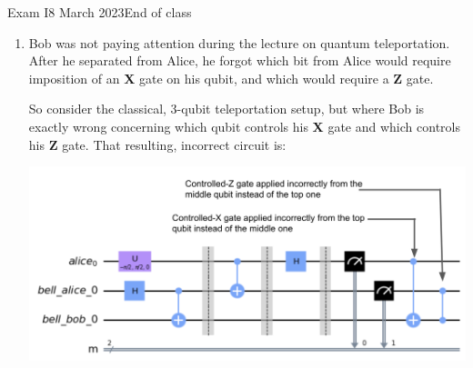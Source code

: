 \documentclass[12pt]{article}
\def\Gate#1{\mbox{\textbf{#1}}}
\def\X{\Gate{X}}
\def\Z{\Gate{Z}}
\newcommand{\Blank}[1][1in]{\mbox{\vrule width #1 depth 2pt}\vrule width 0pt height 2.0em}
\begin{document}
\begin{assignment}{Exam I}{8 March 2023}{End of class}
\begin{enumerate}
\begin{BBKey}
\begin{center}
\begin{tabular}{c|c||c|c||c|c||c}
\end{tabular}
\end{center}
\end{BBKey}
\begin{itemize}
    \item Alice believes the shared key is~\Blank[4in]{}
    \item Bob believes the shared key is\ \ ~\Blank[4in]{}
    \item Eve could have been detected in how many rows of your table?~\Blank{}
\end{itemize}

\clearpage\item{}
Bob was not paying attention during the lecture on quantum teleportation.  After he separated from Alice, he forgot which bit from Alice would require imposition of an \X{} gate on his qubit, and which would require a \Z{} gate.

So consider the classical, 3-qubit teleportation setup, but where Bob is exactly wrong concerning which qubit controls his \X{} gate and which controls his \Z{} gate.  That resulting, incorrect circuit is:

\includegraphics[scale=0.25]{tportwrong.png}


\end{enumerate}
\end{assignment}
\end{document}
